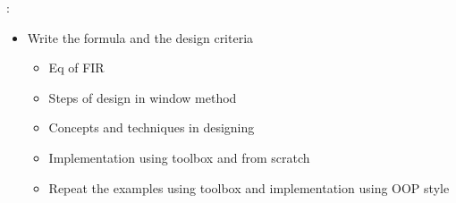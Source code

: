 :

\begin{itemize}

\item Write the formula and the design criteria

    \begin{itemize}
        \item Eq of FIR
        
        \item Steps of design in window method
        
        \item Concepts and techniques in designing
        
        \item Implementation using toolbox and from scratch
        
        \item Repeat the examples using toolbox and implementation using OOP style
        
        
    \end{itemize}

\end{itemize}